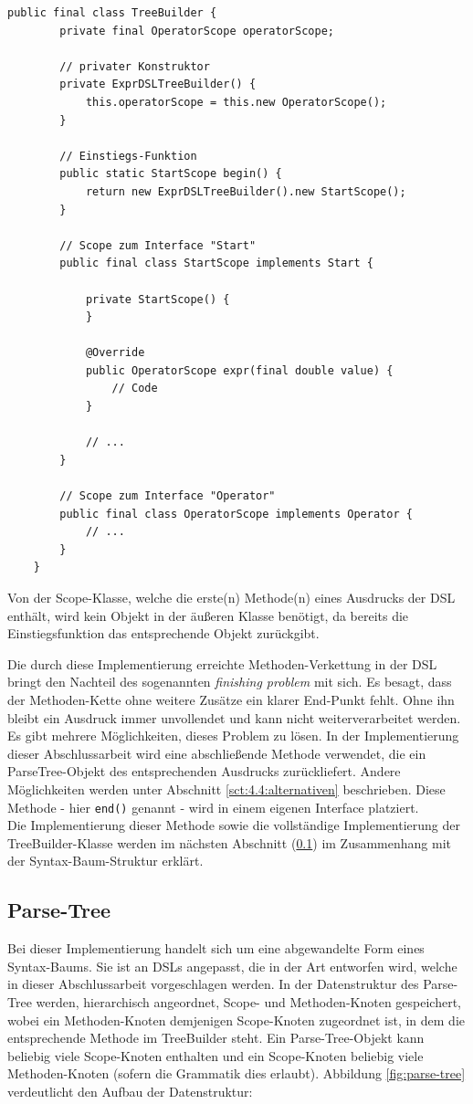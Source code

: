 \begin{lstlisting}[caption={Code für eine Builder-Klasse mit inneren Scope-Klassen},label=lst:treebuilder1]
	public final class TreeBuilder {
		private final OperatorScope operatorScope;
		
		// privater Konstruktor
		private ExprDSLTreeBuilder() {
			this.operatorScope = this.new OperatorScope();
		}
		
		// Einstiegs-Funktion
		public static StartScope begin() {
			return new ExprDSLTreeBuilder().new StartScope();
		}
		
		// Scope zum Interface "Start"
		public final class StartScope implements Start {
	
			private StartScope() {
			}
	
			@Override
			public OperatorScope expr(final double value) {
				// Code	
			}
			
			// ...
		}
		
		// Scope zum Interface "Operator"
		public final class OperatorScope implements Operator {
			// ...
		}
	}
\end{lstlisting}

Von der Scope-Klasse, welche die erste(n) Methode(n) eines Ausdrucks der DSL enthält, wird kein Objekt in der äußeren Klasse benötigt, da bereits die Einstiegsfunktion das entsprechende Objekt zurückgibt.

Die durch diese Implementierung erreichte Methoden-Verkettung in der DSL bringt den Nachteil des sogenannten \emph{finishing problem} \cite{book:fowlerDSL} mit sich. Es besagt, dass der Methoden-Kette ohne weitere Zusätze ein klarer End-Punkt fehlt. Ohne ihn bleibt ein Ausdruck immer unvollendet und kann nicht weiterverarbeitet werden. Es gibt mehrere Möglichkeiten, dieses Problem zu lösen. In der Implementierung dieser Abschlussarbeit wird eine abschließende Methode verwendet, die ein ParseTree-Objekt des entsprechenden Ausdrucks zurückliefert. Andere Möglichkeiten werden unter Abschnitt \ref{sct:4.4:alternativen} beschrieben. Diese Methode - hier \texttt{end()} genannt - wird in einem eigenen Interface platziert.\\
Die Implementierung dieser Methode sowie die vollständige Implementierung der TreeBuilder-Klasse werden im nächsten Abschnitt (\ref{ssct:4.3.3:parsetree}) im Zusammenhang mit der Syntax-Baum-Struktur erklärt.

\subsection{Parse-Tree}\label{ssct:4.3.3:parsetree}
Bei dieser Implementierung handelt sich um eine abgewandelte Form eines Syntax-Baums. Sie ist an DSLs angepasst, die in der Art entworfen wird, welche in dieser Abschlussarbeit vorgeschlagen werden. In der Datenstruktur des Parse-Tree werden, hierarchisch angeordnet, Scope- und Methoden-Knoten gespeichert, wobei ein Methoden-Knoten demjenigen Scope-Knoten zugeordnet ist, in dem die entsprechende Methode im TreeBuilder steht. Ein Parse-Tree-Objekt kann beliebig viele Scope-Knoten enthalten und ein Scope-Knoten beliebig viele Methoden-Knoten (sofern die Grammatik dies erlaubt). Abbildung \ref{fig:parse-tree} verdeutlicht den Aufbau der Datenstruktur:\\

